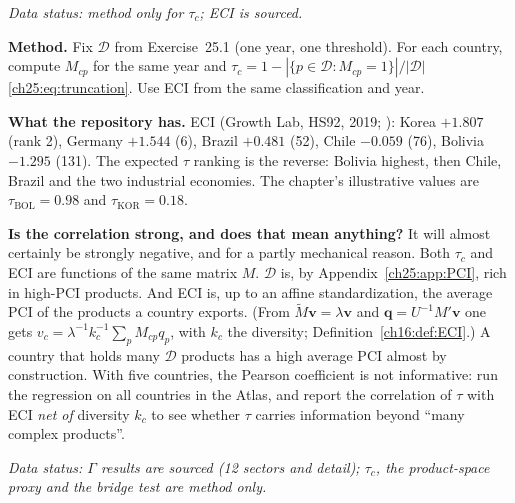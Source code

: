 \documentclass[../solutions_manual.tex]{subfiles}
\begin{document}

\emph{Data status: method only for $\tau_c$; ECI is sourced.}

 \textbf{Method.} Fix $\mathcal{D}$ from Exercise~25.1 (one year, one threshold). For each country, compute $M_{cp}$ for the same year and $\tau_c = 1 - |\{p \in \mathcal{D}: M_{cp} = 1\}|/|\mathcal{D}|$ \eqref{ch25:eq:truncation}. Use ECI from the same classification and year.

 \textbf{What the repository has.} ECI (Growth Lab, HS92, 2019; \citealp{growthlab2026atlas}): Korea $+1.807$ (rank 2), Germany $+1.544$ (6), Brazil $+0.481$ (52), Chile $-0.059$ (76), Bolivia $-1.295$ (131). The expected $\tau$ ranking is the reverse: Bolivia highest, then Chile, Brazil and the two industrial economies. The chapter's illustrative values are $\tau_{\text{BOL}} = 0.98$ and $\tau_{\text{KOR}} = 0.18$.

 \textbf{Is the correlation strong, and does that mean anything?} It will almost certainly be strongly negative, and for a partly mechanical reason. Both $\tau_c$ and ECI are functions of the same matrix $M$. $\mathcal{D}$ is, by Appendix~\ref{ch25:app:PCI}, rich in high-PCI products. And ECI is, up to an affine standardization, the average PCI of the products a country exports. (From $\tilde M\mathbf{v} = \lambda\mathbf{v}$ and $\mathbf{q} = U^{-1}M'\mathbf{v}$ one gets $v_c = \lambda^{-1}k_c^{-1}\sum_p M_{cp}q_p$, with $k_c$ the diversity; Definition~\ref{ch16:def:ECI}.) A country that holds many $\mathcal{D}$ products has a high average PCI almost by construction. With five countries, the Pearson coefficient is not informative: run the regression on all countries in the Atlas, and report the correlation of $\tau$ with ECI \emph{net of} diversity $k_c$ to see whether $\tau$ carries information beyond ``many complex products''.


\emph{Data status: $\Gamma$ results are sourced (12 sectors and detail); $\tau_c$, the product-space proxy and the bridge test are method only.}
\end{document}
